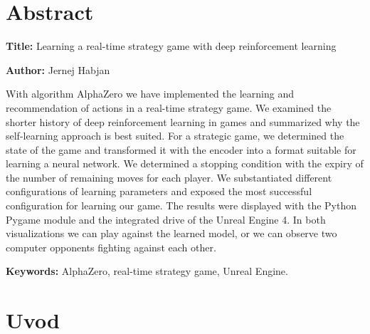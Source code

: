 \documentclass[a4paper, 12pt]{book}
\newcommand{\ttitleEn}{Learning a real-time strategy game with deep reinforcement learning}
\newcommand{\tauthor}{Jernej Habjan}
\newcommand{\tkeywordsEn}{AlphaZero, real-time strategy game, Unreal Engine}
\newcommand{\clearemptydoublepage}{\newpage{\pagestyle{empty}\cleardoublepage}}
\begin{document}
\chapter*{Abstract}

\noindent\textbf{Title:} \ttitleEn
\bigskip

\noindent\textbf{Author:} \tauthor
\bigskip

\noindent With algorithm AlphaZero we have implemented the learning and recommendation of actions in a real-time strategy game.
We examined the shorter history of deep reinforcement learning in games and summarized why the self-learning approach is best suited.
For a strategic game, we determined the state of the game and transformed it with the encoder into a format suitable for learning a neural network.
We determined a stopping condition with the expiry of the number of remaining moves for each player.
We substantiated different configurations of learning parameters and exposed the most successful configuration for learning our game.
The results were displayed with the Python Pygame module and the integrated drive of the Unreal Engine 4.
In both visualizations we can play against the learned model, or we can observe two computer opponents fighting against each other.
\bigskip

\noindent\textbf{Keywords:} \tkeywordsEn.
\clearemptydoublepage

\mainmatter
\setcounter{page}{1}
\pagestyle{fancy}



\chapter{Uvod}
\end{document}

